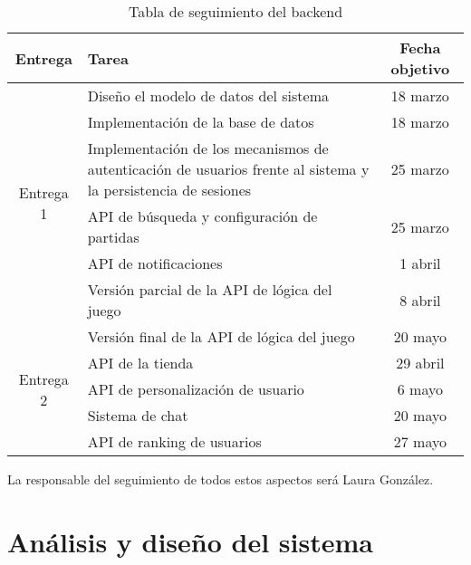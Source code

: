 \documentclass[11pt, a4paper, titlepage]{article}
\begin{document}
\renewcommand{\arraystretch}{1.3}
\begin{table}[hbt!]
\begin{adjustbox}{minipage=18cm, center}
\begin{tabularx}{\textwidth}{|c|X|c| }
\hline
Entrega & Tarea & Fecha objetivo \\\hline
\multirow{6}{*}{Entrega 1}& Diseño el modelo de datos del sistema & 18 marzo\\\cline{2-3}
 & Implementación de la base de datos & 18 marzo \\\cline{2-3}
 & Implementación de los mecanismos de autenticación de usuarios frente al sistema y la persistencia de sesiones & 25 marzo \\\cline{2-3}
 & API de búsqueda y configuración de partidas & 25 marzo\\\cline{2-3}
 & API de notificaciones &  1 abril \\\cline{2-3}
 & Versión parcial de la API de lógica del juego & 8 abril \\\cline{2-3}
\hline
\multirow{5}{*}{Entrega 2} & Versión final de la API de lógica del juego & 20 mayo \\\cline{2-3}
& API de la tienda & 29 abril \\\cline{2-3}
& API de personalización de usuario& 6 mayo \\\cline{2-3}
& Sistema de chat & 20 mayo \\\cline{2-3}
& API de ranking de usuarios &  27 mayo \\\cline{2-3}
\hline
\end{tabularx}
\caption{Tabla de seguimiento del backend}
\label{table:backend}
\end{adjustbox}
\end{table}
\FloatBarrier
 
La responsable del seguimiento de todos estos aspectos será Laura González.

\section{Análisis y diseño del sistema}
\end{document}

